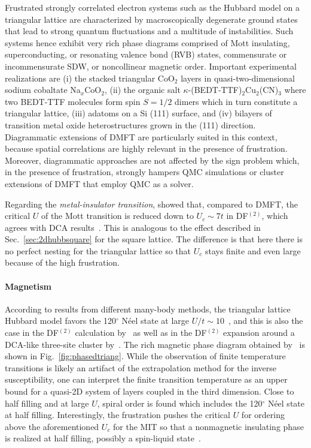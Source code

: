 \documentclass[rmp,aps,reprint,amsmath,amssymb,superscriptaddress,showpacs,nofootinbib]{revtex4-1}
\begin{document}
Frustrated  strongly correlated electron systems such as the Hubbard model on a triangular lattice are characterized by macroscopically degenerate ground states that lead to strong quantum fluctuations and a multitude of instabilities. Such systems hence exhibit very rich phase diagrams comprised of Mott insulating, superconducting, or resonating valence bond (RVB) states, commensurate or incommensurate SDW, or noncollinear magnetic order. Important experimental realizations are (i) the  stacked triangular CoO$_{2}$ layers in quasi-two-dimensional sodium cobaltate Na$_{x}$CoO$_{2}$, (ii) the  organic salt $\kappa$-(BEDT-TTF)$_{2}$Cu$_{2}$(CN)$_{3}$  where two BEDT-TTF molecules  form spin $S=1/2$ dimers which in turn constitute a triangular lattice, (iii) adatoms on a Si (111) surface, and (iv) bilayers of transition metal oxide heterostructures grown in the (111) direction. Diagrammatic extensions of DMFT are particularly suited in this context, because spatial correlations are highly relevant in the presence of frustration. Moreover, diagrammatic approaches are not affected by the sign problem which, in the presence of frustration, strongly hampers QMC simulations or cluster extensions of DMFT that employ QMC as a solver. 

Regarding the {\em metal-insulator transition},  showed that, compared to DMFT, the critical $U$ of the Mott transition is reduced down to $U_{c}\sim 7t$ in DF$^{(2)}$, which agrees with DCA results~\cite{Lee2008}. This is analogous to the effect described in Sec.~\ref{sec:2dhubbsquare} for the square lattice. The difference is that here there is no perfect nesting for the triangular lattice so that  $U_{c}$ stays finite and even large because of the high frustration.

\paragraph*{Magnetism}
According to results from different many-body methods, the triangular lattice Hubbard model favors the 120$^{\circ}$ N\'eel state at large $U/t\sim 10$~\cite{Yoshioka2009,Ohashi2008}, and this is also the case in the  DF$^{(2)}$ calculation by~ as well as in the  DF$^{(2)}$ expansion around a DCA-like three-site cluster by~. The rich magnetic phase diagram obtained  by~  is shown in Fig.~\ref{fig:phasedtriang}. While the observation of finite temperature transitions is likely  an artifact of the extrapolation method for the inverse susceptibility, one can interpret the finite transition temperature as an upper bound for a quasi-2D system of layers coupled in the third dimension.  Close to half filling and at large $U$, spiral order is found which includes the  120$^{\circ}$ N\'eel state at half filling. Interestingly, the frustration pushes the critical $U$ for ordering above the aforementioned $U_c$ for the MIT so that a nonmagnetic insulating phase  is realized at half filling, possibly a spin-liquid state~\cite{Morita2002,Sahebsara2008,Yang2010}.
\end{document}
